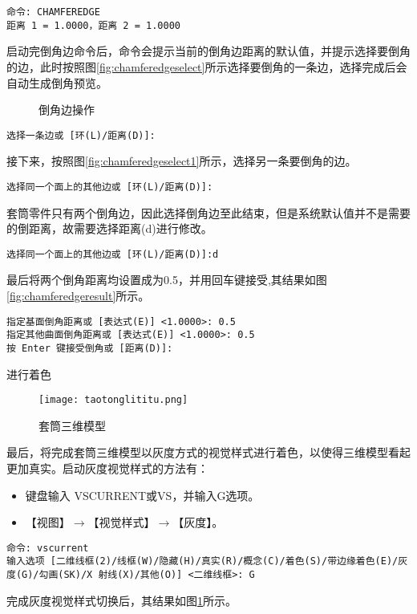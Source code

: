 \begin{procedure}
\begin{lstlisting}
命令: CHAMFEREDGE
距离 1 = 1.0000，距离 2 = 1.0000
\end{lstlisting}
启动完倒角边命令后，命令会提示当前的倒角边距离的默认值，并提示选择要倒角的边，此时按照图\ref{fig:chamferedgeselect}所示选择要倒角的一条边，选择完成后会自动生成倒角预览。
\begin{figure}[htbp]
\centering
{}\hspace{20pt}
\hspace{20pt}
\caption{倒角边操作}
\end{figure}
\begin{lstlisting}
选择一条边或 [环(L)/距离(D)]:
\end{lstlisting}
接下来，按照图\ref{fig:chamferedgeselect1}所示，选择另一条要倒角的边。
\begin{lstlisting}
选择同一个面上的其他边或 [环(L)/距离(D)]:
\end{lstlisting}
套筒零件只有两个倒角边，因此选择倒角边至此结束，但是系统默认值并不是需要的倒距离，故需要选择距离(d)进行修改。
\begin{lstlisting}
选择同一个面上的其他边或 [环(L)/距离(D)]:d
\end{lstlisting}
最后将两个倒角距离均设置成为0.5，并用回车键接受,其结果如图\ref{fig:chamferedgeresult}所示。
\begin{lstlisting}
指定基面倒角距离或 [表达式(E)] <1.0000>: 0.5
指定其他曲面倒角距离或 [表达式(E)] <1.0000>: 0.5
按 Enter 键接受倒角或 [距离(D)]:
\end{lstlisting}
\item 进行着色
\begin{figure}[htbp]
\centering
\texttt{[image: taotonglititu.png]}
\caption{套筒三维模型}\label{fig:taotonglititu}
\end{figure}
最后，将完成套筒三维模型以灰度方式的视觉样式进行着色，以使得三维模型看起更加真实。启动灰度视觉样式的方法有：
\begin{itemize}
\item 键盘输入 VSCURRENT或VS，并输入G选项。
\item 【视图】$\rightarrow$【视觉样式】$\rightarrow$【灰度】。
\end{itemize}
\begin{lstlisting}
命令: vscurrent
输入选项 [二维线框(2)/线框(W)/隐藏(H)/真实(R)/概念(C)/着色(S)/带边缘着色(E)/灰度(G)/勾画(SK)/X 射线(X)/其他(O)] <二维线框>: G
\end{lstlisting}
完成灰度视觉样式切换后，其结果如图\ref{fig:taotonglititu}所示。


\end{procedure}
